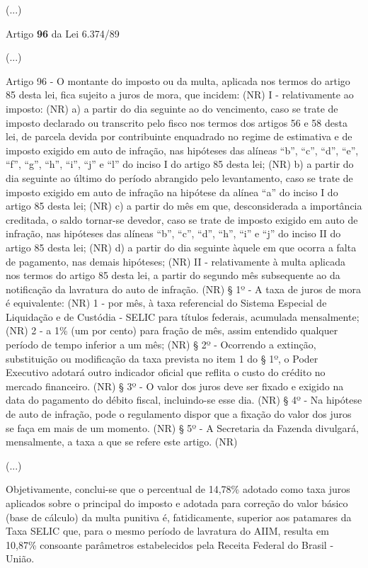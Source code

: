 (...)

Artigo \textbf{96} da Lei 6.374/89

(...)

Artigo 96 - O montante do imposto ou da multa, aplicada nos termos do artigo 85 desta lei, fica sujeito a juros de mora, que incidem: (NR)
I - relativamente ao imposto: (NR)
a) a partir do dia seguinte ao do vencimento, caso se trate de imposto declarado ou transcrito pelo fisco nos termos dos artigos 56 e 58 desta lei, de parcela devida por contribuinte enquadrado no regime de estimativa e de imposto exigido em auto de infração, nas hipóteses das alíneas “b”, “c”, “d”, “e”, “f”, “g”, “h”, “i”, “j” e “l” do inciso I do artigo 85 desta lei; (NR)
b) a partir do dia seguinte ao último do período abrangido pelo levantamento, caso se trate de imposto exigido em auto de infração na hipótese da alínea “a” do inciso I do artigo 85 desta lei; (NR)
c) a partir do mês em que, desconsiderada a importância creditada, o saldo tornar-se devedor, caso se trate de imposto exigido em auto de infração, nas hipóteses das alíneas “b”, “c”, “d”, “h”, “i” e “j” do inciso II do artigo 85 desta lei; (NR)
d) a partir do dia seguinte àquele em que ocorra a falta de pagamento, nas demais hipóteses; (NR)
II - relativamente à multa aplicada nos termos do artigo 85 desta lei, a partir do segundo mês subsequente ao da notificação da lavratura do auto de infração. (NR)
§ 1º - A taxa de juros de mora é equivalente: (NR) 
1 - por mês, à taxa referencial do Sistema Especial de Liquidação e de Custódia - SELIC para títulos federais, acumulada mensalmente; (NR)
2 - a 1\% (um por cento) para fração de mês, assim entendido qualquer período de tempo inferior a um mês; (NR)
§ 2º - Ocorrendo a extinção, substituição ou modificação da taxa prevista no item 1 do § 1º, o Poder Executivo adotará outro indicador oficial que reflita o custo do crédito no mercado financeiro. (NR)
§ 3º - O valor dos juros deve ser fixado e exigido na data do pagamento do débito fiscal, incluindo-se esse dia. (NR)
§ 4º - Na hipótese de auto de infração, pode o regulamento dispor que a fixação do valor dos juros se faça em mais de um momento. (NR)
§ 5º - A Secretaria da Fazenda divulgará, mensalmente, a taxa a que se refere este artigo. (NR)

(...)

Objetivamente, conclui-se que o percentual de 14,78\% adotado como taxa juros aplicados sobre o principal do imposto e adotada para correção do valor básico (base de cálculo) da multa punitiva é, fatidicamente, superior aos patamares da Taxa SELIC que, para o mesmo período de lavratura do AIIM, resulta em 10,87\% consoante parâmetros estabelecidos pela Receita Federal do Brasil - União.

